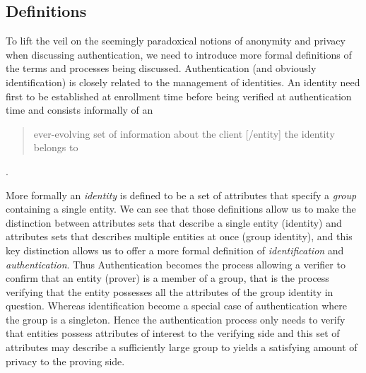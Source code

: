     \subsection{Definitions}
    \label{subsec:definitions}

    To lift the veil on the seemingly paradoxical notions of anonymity and privacy when discussing authentication, we need to introduce
    more formal definitions of the terms and processes being discussed.\newline
    Authentication (and obviously identification) is closely related to the management of identities.
    An identity need first to be established at enrollment time before being verified at authentication time and consists
    informally of an \blockquote{ever-evolving\sidenote{%
        Indeed every authenticated action can enrich the initial set of information (from enrollment time) a provider knows about a client.
    } set of information about the client [/entity\sidenote{%
        An \textbf{entity} represents a user, object or resource and can have multiple identities
    }] the identity belongs to}\cite{syta_identity_2015}.

    More formally an \emph{identity} is defined to be a set of attributes\sidenote{%
        Attributes are properties of an entity, and a set of attributes, called a \emph{group identity}, specifies
        a \emph{group} \blockquote{consisting of exactly those entities satisfying all attributes in the group identity}\cite{syta_identity_2015}.
    } that specify a \emph{group} containing a single entity.\cite{syta_identity_2015}
    We can see that those definitions allow us to make the distinction between attributes sets that describe a single entity (identity) and
    attributes sets that describes multiple entities at once (group identity), and this key distinction allows us to offer
    a more formal definition of \emph{identification} and \emph{authentication}.
    Thus Authentication becomes the process allowing a verifier to confirm that an entity (prover) is a member of a group,
    that is the process verifying that the entity possesses all the attributes of the group identity in question.
    Whereas identification become a special case of authentication where the group is a singleton.
    Hence the authentication process only needs to verify that entities possess attributes of interest to the verifying side
    and this set of attributes may describe a sufficiently large group to yields a satisfying amount of privacy to the proving side.

